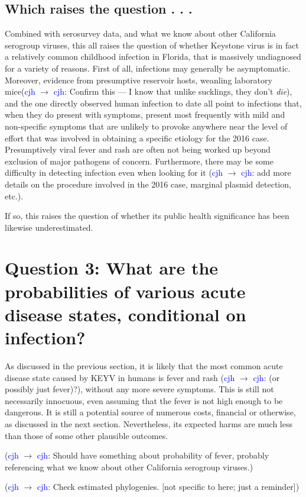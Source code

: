 \documentclass{article}
\newcommand{\cjh}{\textcolor{blue}{cjh}}
\newcommand{\msg}[3]{(#1 $\rightarrow$ #2: #3)}
\newcommand{\mcc}[1]{\msg\cjh\cjh{#1}}
\begin{document}
        \subsection{Which raises the question . . .}
            Combined with serosurvey data, and what we know about other California serogroup viruses, this all raises the question of whether Keystone virus is in fact a relatively common childhood infection in Florida, that is massively undiagnosed for a variety of reasons. First of all, infections may generally be asymptomatic. Moreover, evidence from presumptive reservoir hosts, weanling laboratory mice\mcc{Confirm this --- I know that unlike sucklings, they don't \textit{die}}, and the one directly observed human infection to date all point to infections that, when they do present with symptoms, present most frequently with mild and non-specific symptoms that are unlikely to provoke anywhere near the level of effort that was involved in obtaining a specific etiology for the 2016 case. Presumptively viral fever and rash are often not being worked up beyond exclusion of major pathogens of concern. Furthermore, there may be some difficulty in detecting infection even when looking for it \mcc{add more details on the procedure involved in the 2016 case, marginal plasmid detection, etc.}.

            If so, this raises the question of whether its public health significance has been likewise underestimated.


    \section[Probabilities of disease, given infection]{Question 3: What are the probabilities of various acute disease states, conditional on infection?}
        As discussed in the previous section, it is likely that the most common acute disease state caused by KEYV in humans is fever and rash \mcc{(or possibly just fever)?}, without any more severe symptoms. This is still not necessarily innocuous, even assuming that the fever is not high enough to be dangerous. It is still a potential source of numerous costs, financial or otherwise, as discussed in the next section. Nevertheless, its expected harms are much less than those of some other plausible outcomes.

        \mcc{Should have something about probability of fever, probably referencing what we know about other California serogroup viruses.}

        \mcc{Check estimated phylogenies. [not specific to here; just a reminder]}
\end{document}
